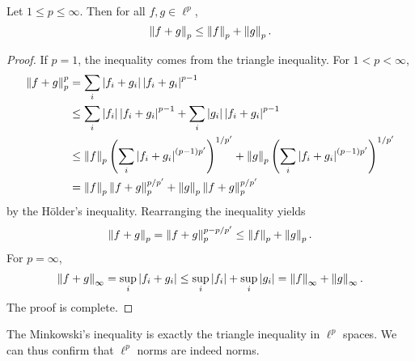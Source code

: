 \begin{theorem}
    Let $1\leq p\leq\infty$. Then for all $f,g\in\ell^p$, 
    \begin{equation*}
        \left\lVert {f+g} \right\rVert_p \leq \left\lVert {f} \right\rVert_p + \left\lVert {g} \right\rVert_p.
    \end{equation*}
\end{theorem}
\begin{proof}
    If $p = 1$, the inequality comes from the triangle inequality. 
    For $1<p<\infty$, 
    \begin{equation*}
        \begin{split}
            \norm{f+g}_p^p &= \sum_i \abs{f_i+g_i}\abs{f_i+g_i}^{p-1} \\
            &\leq \sum_i \abs{f_i}\abs{f_i+g_i}^{p-1} + \sum_i \abs{g_i}\abs{f_i+g_i}^{p-1} \\
            &\leq \norm{f}_p\pth{\sum_i \abs{f_i+g_i}^{(p-1)p'}}^{1/p'} + \norm{g}_p\pth{\sum_i \abs{f_i+g_i}^{(p-1)p'}}^{1/p'} \\ 
            &= \norm{f}_p\norm{f+g}_p^{p/p'} + \norm{g}_p\norm{f+g}_p^{p/p'}
        \end{split}
    \end{equation*}
    by the H\"older's inequality. Rearranging the inequality yields 
    \begin{equation*}
        \left\lVert {f+g} \right\rVert_p = \left\lVert {f+g} \right\rVert_p^{p-p/p'} \leq \left\lVert {f} \right\rVert_p + \left\lVert {g} \right\rVert_p.
    \end{equation*}
    For $p = \infty$, 
    \begin{equation*}
        \left\lVert {f+g} \right\rVert_\infty = \sup_i\left\lvert {f_i+g_i} \right\rvert \leq \sup_i\left\lvert {f_i} \right\rvert + \sup_i\left\lvert {g_i} \right\rvert = \left\lVert {f} \right\rVert_\infty + \left\lVert {g} \right\rVert_\infty.
    \end{equation*}
    The proof is complete.
\end{proof}
\begin{remark}
    The Minkowski's inequality is exactly the triangle inequality 
    in $\ell^p$ spaces. We can thus confirm that $\ell^p$ norms 
    are indeed norms.
\end{remark}

